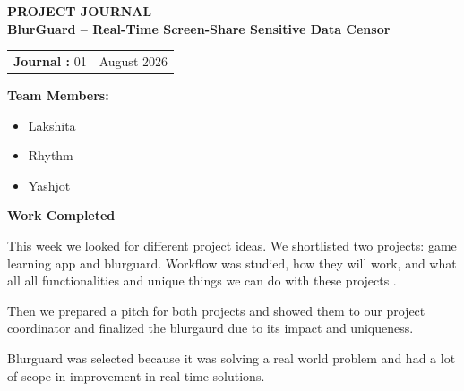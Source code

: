 \documentclass[12pt,a4paper]{article}
\begin{document}

\begin{center}
    {\Large \textbf{PROJECT JOURNAL }}\\[10pt]

    {\large \textbf{BlurGuard -- Real-Time Screen-Share Sensitive Data Censor}}
\end{center}

\vspace{10pt}


\begin{tabular}{@{}p{}p{}@{}}
\textbf{Journal :} 01 &
\raggedleft \textbf{} August 2026
\end{tabular}

\vspace{12pt}


\textbf{Team Members:}

\begin{itemize}[leftmargin=1.5cm]
    \item Lakshita
    \item Rhythm
    \item Yashjot
\end{itemize}

\vspace{5pt}


\textbf{\large Work Completed}

\vspace{4pt}
This week we looked for different project ideas. We shortlisted two projects: game learning app and blurguard. Workflow was studied, how they will work, and what all all functionalities and unique things we can do with these projects .

Then we prepared a pitch for both projects and showed them to our project coordinator and finalized the blurgaurd due to its impact and uniqueness.

Blurguard was selected because it was solving a real world problem and had a lot of scope in improvement in real time solutions.
\end{document}
